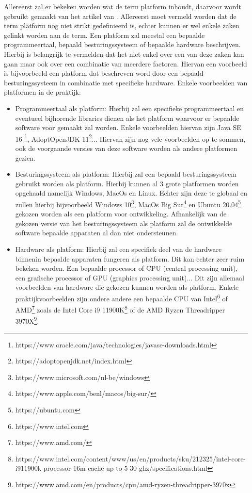 Allereerst zal er bekeken worden wat de term platform inhoudt, daarvoor wordt gebruikt gemaakt van het artikel van \textcite{Bishop2006}. Allereerst moet vermeld worden dat de term platform nog niet strikt gedefinieerd is, echter kunnen er wel enkele zaken gelinkt worden aan de term. Een platform zal meestal een bepaalde programmeertaal, bepaald besturingssysteem of bepaalde hardware beschrijven. Hierbij is belangrijk te vermelden dat het niet enkel over een van deze zaken kan gaan maar ook over een combinatie van meerdere factoren. Hiervan een voorbeeld is bijvoorbeeld een platform dat beschreven word door een bepaald besturingssysteem in combinatie met specifieke hardware. Enkele voorbeelden van platformen in de praktijk:
\begin{itemize}
\item Programmeertaal als platform:
Hierbij zal een specifieke programmeertaal en eventueel bijhorende libraries dienen als het platform waarvoor er bepaalde software voor gemaakt zal worden. Enkele voorbeelden hiervan zijn Java SE 16 \footnote{https://www.oracle.com/java/technologies/javase-downloads.html}, AdoptOpenJDK 11\footnote{https://adoptopenjdk.net/index.html}... Hiervan zijn nog vele voorbeelden op te sommen, ook de voorgaande versies van deze software worden als andere platformen gezien.
\item Besturingssysteem als platform:
Hierbij zal een bepaald besturingssysteem gebruikt worden als platform. Hierbij kunnen al 3 grote platformen worden opgehaald namelijk Windows, MacOs en Linux. Echter zijn deze te globaal en zullen hierbij bijvoorbeeld Windows 10\footnote{https://www.microsoft.com/nl-be/windows}, MacOs Big Sur\footnote{https://www.apple.com/benl/macos/big-sur/} en Ubuntu 20.04\footnote{https://ubuntu.com} gekozen worden als een platform voor ontwikkeling. Afhankelijk van de gekozen versie van het besturingssysteem als platform zal de ontwikkelde software bepaalde apparaten al dan niet ondersteunen.
\item Hardware als platform:
Hierbij zal een specifiek deel van de hardware binnenin bepaalde apparaten fungeren als platform. Dit kan echter zeer ruim bekeken worden. Een bepaalde processor of CPU (central processing unit), een grafische processor of GPU (graphics processing unit)... Dit zijn allemaal voorbeelden van hardware die gekozen kunnen worden als platform. Enkele praktijkvoorbeelden zijn ondere andere een bepaalde CPU van Intel\footnote{https://www.intel.com} of AMD\footnote{https://www.amd.com/} zoals de Intel Core i9 11900K\footnote{https://www.intel.com/content/www/us/en/products/sku/212325/intel-core-i911900k-processor-16m-cache-up-to-5-30-ghz/specifications.html} of de AMD Ryzen Threadripper 3970X\footnote{https://www.amd.com/en/products/cpu/amd-ryzen-threadripper-3970x}.

\end{itemize}
